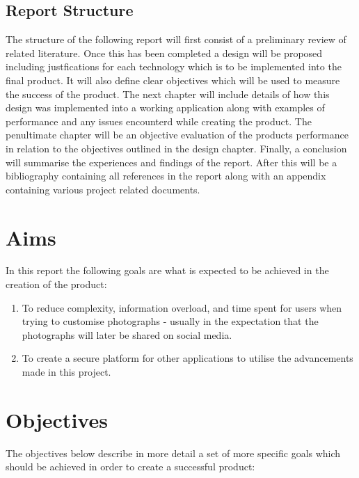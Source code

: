 \documentclass[a4paper,12pt]{report}
\begin{document}
  \subsection{Report Structure}
    The structure of the following report will first consist of a preliminary review of related literature. Once this has been completed a design will be proposed including justfications for each technology which is to be implemented into the final product. It will also define clear objectives which will be used to measure the success of the product. The next chapter will include details of how this design was implemented into a working application along with examples of performance and any issues encounterd while creating the product. The penultimate chapter will be an objective evaluation of the products performance in relation to the objectives outlined in the design chapter. Finally, a conclusion will summarise the experiences and findings of the report. After this will be a bibliography containing all references in the report along with an appendix containing various project related documents.

  \newpage

  \section{Aims}
    In this report the following goals are what is expected to be achieved in the creation of the product:

    \begin{enumerate}
      \item To reduce complexity, information overload, and time spent for users when trying to customise photographs - usually in the expectation that the photographs will later be shared on social media.
      \item To create a secure platform for other applications to utilise the advancements made in this project.
    \end{enumerate}

  \section{Objectives} \label{sec:objectives}
    The objectives below describe in more detail a set of more specific goals which should be achieved in order to create a successful product:
\end{document}
